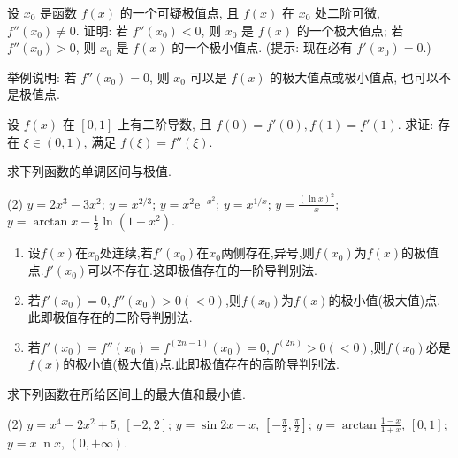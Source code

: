 \begin{exercise}[3.3.19]
    设 $x_0$ 是函数 $f(x)$ 的一个可疑极值点, 且 $f(x)$ 在 $x_0$ 处二阶可微, $f''(x_0) \ne 0$. 证明: 若 $f''(x_0)<0$, 则 $x_0$ 是 $f(x)$ 的一个极大值点; 若 $f''(x_0)>0$, 则 $x_0$ 是 $f(x)$ 的一个极小值点. (提示: 现在必有 $f'(x_0)=0$.)

    举例说明: 若 $f''(x_0)=0$, 则 $x_0$ 可以是 $f(x)$ 的极大值点或极小值点, 也可以不是极值点.
\end{exercise}

\begin{exercise}[3.3.20]
    设 $f(x)$ 在 $[0,1]$ 上有二阶导数, 且 $f(0)=f'(0), f(1)=f'(1)$. 求证: 存在 $\xi \in (0,1)$, 满足 $f(\xi)=f''(\xi)$.
\end{exercise}

\begin{exercise}[3.3.21]
    求下列函数的单调区间与极值.
    \begin{tasks}[label=(\arabic*)](2)
        \task $y = 2x^3-3x^2$;
        \task $y = x^{2/3}$;
        \task $y = x^2\mathrm{e}^{-x^2}$;
        \task $y = x^{1/x}$;
        \task $y = \frac{(\ln x)^2}{x}$;
        \task $y = \arctan x - \frac{1}{2}\ln(1+x^2)$.
    \end{tasks}
\end{exercise}

\begin{proposition*}[极值点的判别法] \quad
    \begin{enumerate}
        \item 设$f(x)$在$x_0$处连续,若$f'(x_0)$在$x_0$两侧存在,异号,则$f(x_0)$为$f(x)$的极值点.$f'(x_0)$可以不存在.这即极值存在的一阶导判别法.
        \item 若$f'(x_0) = 0, f''(x_0) > 0(<0)$,则$f(x_0)$为$f(x)$的极小值(极大值)点.此即极值存在的二阶导判别法.
        \item 若$f'(x_0) = f''(x_0) = f^{(2n-1)}(x_0) = 0, f^{(2n)} >0 (<0)$,则$f(x_0)$必是$f(x)$的极小值(极大值)点.此即极值存在的高阶导判别法.
    \end{enumerate}
\end{proposition*}

\begin{exercise}[3.3.22]
    求下列函数在所给区间上的最大值和最小值.
    \begin{tasks}[label=(\arabic*)](2)
        \task $y = x^4 - 2x^2+5$, $[ -2, 2]$;
        \task $y = \sin 2x - x$, $[-\frac{\pi}{2}, \frac{\pi}{2}]$;
        \task $y = \arctan\frac{1-x}{1+x}$, $[0,1]$;
        \task $y = x\ln x$, $(0, +\infty)$.
    \end{tasks}
\end{exercise}

